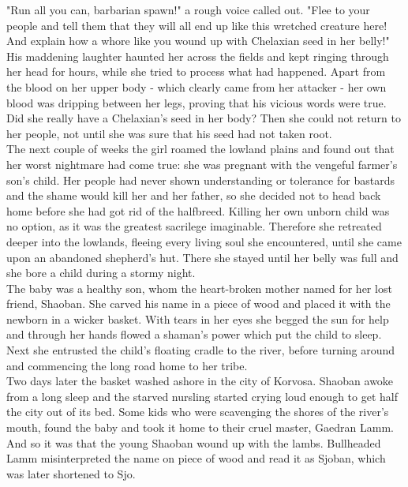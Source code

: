 "Run all you can, barbarian spawn!" a rough voice called out. "Flee to your people and tell them that they will all end up like this wretched creature here! And explain how a whore like you wound up with Chelaxian seed in her belly!"\\

His maddening laughter haunted her across the fields and kept ringing through her head for hours, while she tried to process what had happened. Apart from the blood on her upper body - which clearly came from her attacker - her own blood was dripping between her legs, proving that his vicious words were true. Did she really have a Chelaxian's seed in her body? Then she could not return to her people, not until she was sure that his seed had not taken root.\\

The next couple of weeks the girl roamed the lowland plains and found out that her worst nightmare had come true: she was pregnant with the vengeful farmer's son's child. Her people had never shown understanding or tolerance for bastards and the shame would kill her and her father, so she decided not to head back home before she had got rid of the halfbreed. Killing her own unborn child was no option, as it was the greatest sacrilege imaginable. Therefore she retreated deeper into the lowlands, fleeing every living soul she encountered, until she came upon an abandoned shepherd's hut. There she stayed until her belly was full and she bore a child during a stormy night.\\

The baby was a healthy son, whom the heart-broken mother named for her lost friend, Shaoban. She carved his name in a piece of wood and placed it with the newborn in a wicker basket. With tears in her eyes she begged the sun for help and through her hands flowed a shaman's power which put the child to sleep. Next she entrusted the child's floating cradle to the river, before turning around and commencing the long road home to her tribe.\\

Two days later the basket washed ashore in the city of Korvosa. Shaoban awoke from a long sleep and the starved nursling started crying loud enough to get half the city out of its bed. Some kids who were scavenging the shores of the river's mouth, found the baby and took it home to their cruel master, Gaedran Lamm. And so it was that the young Shaoban wound up with the lambs. Bullheaded Lamm misinterpreted the name on piece of wood and read it as Sjoban, which was later shortened to Sjo.\\

